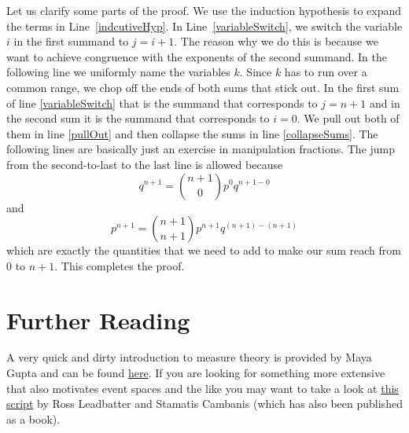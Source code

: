 Let us clarify some parts of the proof. We use the induction hypothesis to expand the terms in Line~\ref{indcutiveHyp}. 
In Line~\ref{variableSwitch}, we switch the variable $ i $ in the first summand to $ j = i+1 $. The
reason why we do this is because we want to achieve congruence with the exponents of the second summand. In the following line we 
uniformly name the variables $ k $. Since $ k $ has to run over a common range, we chop off the ends of both sums that stick out. In the first
sum of line \ref{variableSwitch} that is the summand that corresponds to $ j=n+1 $ and in the second sum it is the summand that corresponds
to $ i = 0 $. We pull out both of them in line \ref{pullOut} and then collapse the sums in line \ref{collapseSums}. The following lines 
are basically just an exercise in manipulation fractions. The jump from the second-to-last to the last line is allowed because
$$ q^{n+1} = \binom{n+1}{0}p^{0}q^{n+1-0} $$ and $$ p^{n+1} = \binom{n+1}{n+1}p^{n+1}q^{(n+1)-(n+1)} $$
which are exactly the quantities that we need to add to make our sum reach from $ 0 $ to $ n+1 $. This completes the proof.

\section*{Further Reading}
A very quick and dirty introduction to measure theory is provided by Maya Gupta and can be found 
\href{https://www.ee.washington.edu/techsite/papers/documents/UWEETR-2006-0008.pdf}{here}. If you are
looking for something more extensive that also motivates event spaces and the like you may want to 
take a look at \href{http://www.stat.ncsu.edu/people/fuentes/courses/st778/lectures/ross}{this script}
by Ross Leadbatter and Stamatis Cambanis (which has also been
published as a book).




